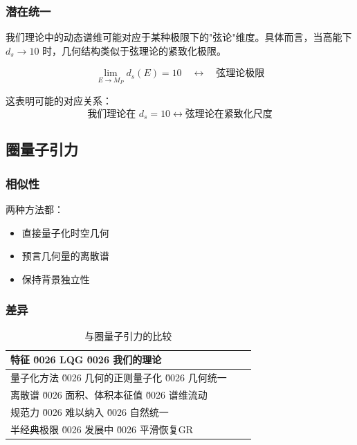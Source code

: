 \subsubsection{潜在统一}

我们理论中的动态谱维可能对应于某种极限下的"弦论"维度。具体而言，当高能下 $d_s \to 10$ 时，几何结构类似于弦理论的紧致化极限。

\begin{equation}
    \lim_{E \to M_P} d_s(E) = 10 \quad \leftrightarrow \quad \text{弦理论极限}
\end{equation}

这表明可能的对应关系：
\begin{equation}
    \text{我们理论在 } d_s = 10 \longleftrightarrow \text{弦理论在紧致化尺度}
\end{equation}

\subsection{圈量子引力}

\subsubsection{相似性}

两种方法都：
\begin{itemize}
    \item 直接量子化时空几何
    \item 预言几何量的离散谱
    \item 保持背景独立性
\end{itemize}

\subsubsection{差异}

\begin{table}[htbp]
\centering
\caption{与圈量子引力的比较}
\label{tab:lqg_comparison}
\begin{tabular}{p{4cm}p{4cm}p{4cm}}
\toprule
\textbf{特征} \u0026 \textbf{LQG} \u0026 \textbf{我们的理论} \\
\midrule
量子化方法 \u0026 几何的正则量子化 \u0026 几何统一 \\
离散谱 \u0026 面积、体积本征值 \u0026 谱维流动 \\
规范力 \u0026 难以纳入 \u0026 自然统一 \\
半经典极限 \u0026 发展中 \u0026 平滑恢复GR \\
\bottomrule
\end{tabular}
\end{table}

